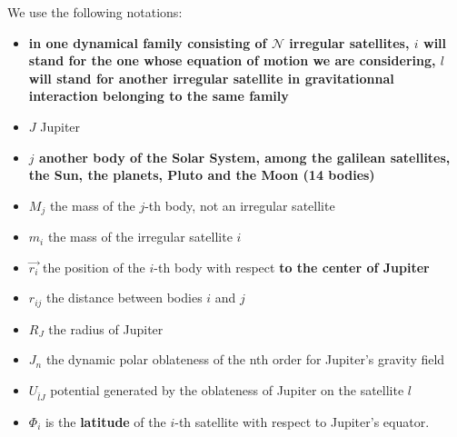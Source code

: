 \documentclass[useAMS,usenatbib]{mn2e}
\begin{document}
We use the following notations: \begin{itemize}
\item \textbf{in one dynamical family consisting of $\mathcal{N}$ irregular satellites, $i$ will stand for the one whose equation of motion we are considering, $l$ will stand for another irregular satellite in gravitationnal interaction belonging to the same family}
\item $J$ Jupiter
\item \textbf{$j$ another body of the Solar System, among the galilean satellites, the Sun, the planets, Pluto and the Moon (14 bodies)}
\item $M_j$ the mass of the $j$-th body, not an irregular satellite
\item $m_i$ the mass of the irregular satellite $i$
\item $\vec{r_i}$ the position of the $i$-th body with respect \textbf{to the center of Jupiter}
\item $r_{ij}$ the distance between bodies $i$ and $j$
\item $R_J$ the radius of Jupiter
\item $J_n$ the dynamic polar oblateness of the nth order for Jupiter's gravity field
\item $U_{\bar{l}\hat{J}}$ potential generated by the oblateness of Jupiter on the satellite $l$
\item $\Phi_i$ is the \textbf{latitude} of the $i$-th satellite with respect to Jupiter's equator.
\end{itemize}
\end{document}
